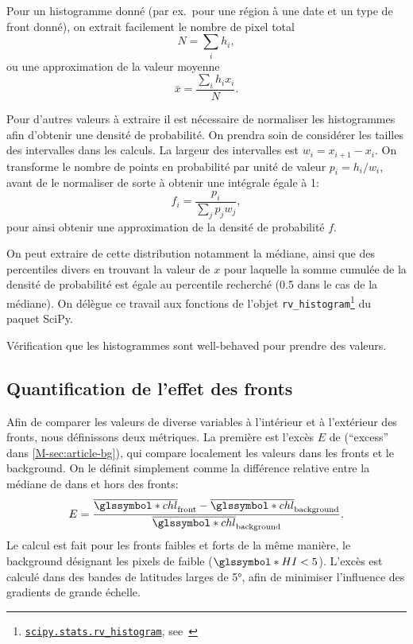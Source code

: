 \documentclass[index]{subfiles}
\begin{document}
Pour un histogramme donné (par ex.\ pour une région à une date et un type de front donné), on extrait facilement le nombre de pixel total
\begin{equation}
  N = \sum_i h_i,
\end{equation}
ou une approximation de la valeur moyenne
\begin{equation}
  \bar{x} = \frac{\sum_i h_i x_i} {N}.
\end{equation}

Pour d'autres valeurs à extraire il est nécessaire de normaliser les histogrammes afin d'obtenir une densité de probabilité. On prendra soin de considérer les tailles des intervalles dans les calculs.
La largeur des intervalles est \(w_i = x_{i+1}-x_i\). On transforme le nombre de points en probabilité par unité de valeur \(p_i = h_i / w_i \), avant de le normaliser de sorte à obtenir une intégrale égale à 1:
\begin{equation}
  f_i = \frac{p_i} {\sum_j p_j w_j},
\end{equation}
pour ainsi obtenir une approximation de la densité de probabilité \(f\).

On peut extraire de cette distribution notamment la médiane, ainsi que des percentiles divers en trouvant la valeur de \(x\) pour laquelle la somme cumulée de la densité de probabilité est égale au percentile recherché (0.5 dans le cas de la médiane).
On délègue ce travail aux fonctions de l'objet \verb|rv_histogram|\footnote{
  \href{https://docs.scipy.org/doc/scipy/reference/generated/scipy.stats.rv_histogram.html}
  {\texttt{scipy.stats.rv\_histogram}},
  see~\cite{virtanen_2020}
}
du paquet SciPy.

Vérification que les histogrammes sont well-behaved pour prendre des valeurs.

\subsection{Quantification de l'effet des fronts}
\label{sec:extraction-surplus}

Afin de comparer les valeurs de diverse variables à l'intérieur et à l'extérieur des fronts, nous définissons deux métriques.
La première est l'excès \(E\) de  (\enquote{excess} dans \cref{M-sec:article-bg}), qui compare localement les valeurs dans les fronts et le background. On le définit simplement comme la différence relative entre la médiane de  dans et hors des fronts:
\begin{equation}
  E = \frac{\med{\am{chl}}_\frt - \med{\am{chl}}_\bkg}
  {\med{\am{chl}}_\bkg} .
\end{equation}
Le calcul est fait pour les fronts faibles et forts de la même manière, le background désignant les pixels de  faible (\(\am{HI} < 5\)).
L'excès est calculé dans des bandes de latitudes larges de \ang{5}, afin de minimiser l'influence des gradients de grande échelle.
\end{document}
